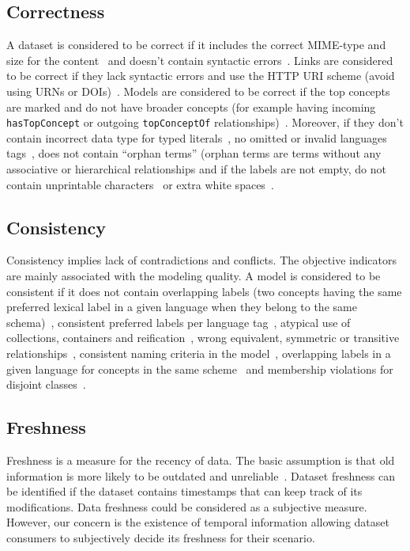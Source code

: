 \documentclass[onecolumn, crcready]{../../Tools/LaTEX/iosart2c}
\begin{document}
\subsection{Correctness}
A dataset is considered to be correct if it includes the correct MIME-type and size for the content~\cite{Hogan:LDOW:10} and doesn't contain syntactic errors~\cite{Hogan:LDOW:10}. Links are considered to be correct if they lack syntactic errors and use the HTTP URI scheme (avoid using URNs or DOIs)~\cite{Mader:TBDL:12}. Models are considered to be correct if the top concepts are marked and do not have broader concepts (for example having incoming \texttt{hasTopConcept} or outgoing \texttt{topConceptOf} relationships)~\cite{Mader:TBDL:12}. Moreover, if they don't contain incorrect data type for typed literals~\cite{Hogan:LDOW:10}\cite{Acosta:ISWC:13}, no omitted or invalid languages tags~\cite{Suominen:IKEM:12,Mader:TBDL:12}, does not contain ``orphan terms'' (orphan terms are terms without any associative or hierarchical relationships and if the labels are not empty, do not contain unprintable characters~\cite{Acosta:ISWC:13,Mader:TBDL:12} or extra white spaces~\cite{Suominen:IKEM:12}.

\subsection{Consistency}
Consistency implies lack of contradictions and conflicts. The objective indicators are mainly associated with the modeling quality. A model is considered to be consistent if it does not contain overlapping labels (two concepts having the same preferred lexical label in a given language when they belong to the same schema)~\cite{Isaac:W3C:09,Mader:TBDL:12}, consistent preferred labels per language tag~\cite{Mader:TBDL:12,Suominen:IKEM:12}, atypical use of collections, containers and reification~\cite{Hogan:LDOW:10}, wrong equivalent, symmetric or transitive relationships~\cite{Maria:KEOD:13}, consistent naming criteria in the model~\cite{Mader:TBDL:12,Maria:KEOD:13}, overlapping labels in a given language for concepts in the same scheme~\cite{Mader:TBDL:12} and membership violations for disjoint classes~\cite{Hogan:LDOW:10,Maria:KEOD:13}.

\subsection{Freshness}
Freshness is a measure for the recency of data. The basic assumption is that old information is more likely to be outdated and unreliable~\cite{Flouris:EvoDyn:12}. Dataset freshness can be identified if the dataset contains timestamps that can keep track of its modifications. Data freshness could be considered as a subjective measure. However, our concern is the existence of temporal information allowing dataset consumers to subjectively decide its freshness for their scenario.
\end{document}

